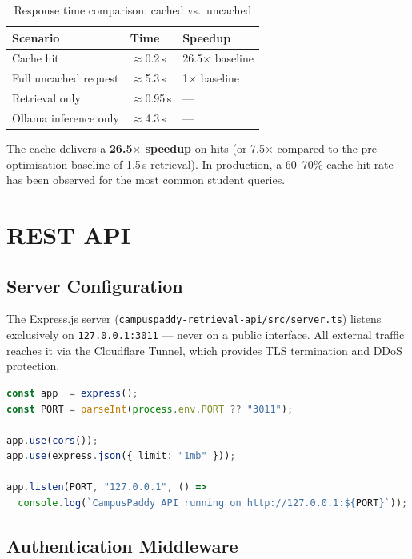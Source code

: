 \documentclass[12pt,a4paper]{report}
\begin{document}
\begin{table}[H]
\centering
\caption{Response time comparison: cached vs.\ uncached}
\begin{tabular}{lll}
\toprule
\textbf{Scenario} & \textbf{Time} & \textbf{Speedup} \\
\midrule
Cache hit             & $\approx$0.2\,s  & 26.5$\times$ baseline \\
Full uncached request & $\approx$5.3\,s  & 1$\times$ baseline \\
Retrieval only        & $\approx$0.95\,s & ---  \\
Ollama inference only & $\approx$4.3\,s  & --- \\
\bottomrule
\end{tabular}
\end{table}

The cache delivers a \textbf{26.5$\times$ speedup} on hits (or 7.5$\times$ compared to the pre-optimisation baseline of 1.5\,s retrieval). In production, a 60--70\% cache hit rate has been observed for the most common student queries.

\chapter{REST API}

\section{Server Configuration}

The Express.js server (\texttt{campuspaddy-retrieval-api/src/server.ts}) listens exclusively on \texttt{127.0.0.1:3011} --- never on a public interface. All external traffic reaches it via the Cloudflare Tunnel, which provides TLS termination and DDoS protection.

\begin{lstlisting}[language=TypeScript, caption=Server startup]
const app  = express();
const PORT = parseInt(process.env.PORT ?? "3011");

app.use(cors());
app.use(express.json({ limit: "1mb" }));

app.listen(PORT, "127.0.0.1", () =>
  console.log(`CampusPaddy API running on http://127.0.0.1:${PORT}`));
\end{lstlisting}

\section{Authentication Middleware}
\end{document}
